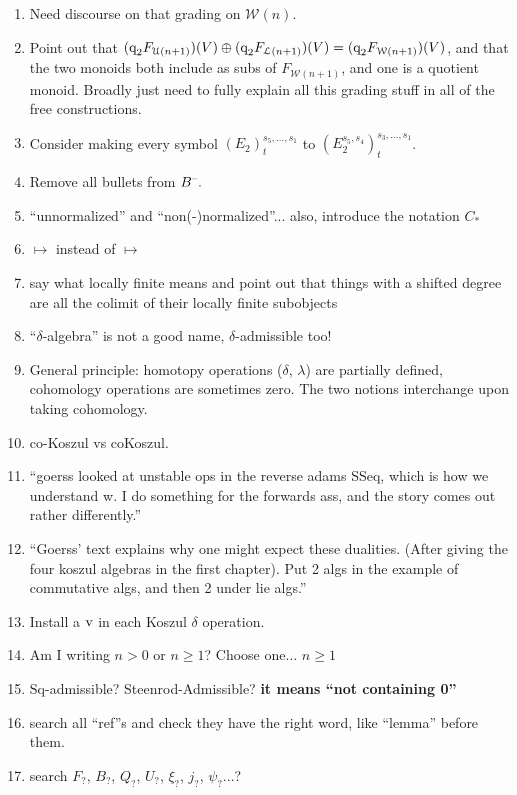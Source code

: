 \documentclass[11pt]{amsart}
\theoremstyle{plain}
\theoremstyle{definition}
\newcommand{\DASH}{\textup{--}}
\newcommand{\calU}{\mathcal{U}}
\newcommand{\calL}{\mathcal{L}}
\newcommand{\calw}{\mathcal{W}}
\newcommand{\calc}{\mathcal{C}}
\theoremstyle{plain}
\newcommand{\quadgrad}[1]{\textup{q}_{#1}}
\newcommand{\Sq}{\mathrm{Sq}}
\begin{document}
\begin{todolist}
\begin{enumerate}
\item Need discourse on that grading on $\calw(n)$.
\item Point out that $(\quadgrad{2}F_{\calU(n+1)})(V)\oplus (\quadgrad{2}F_{\calL(n+1)})(V)=(\quadgrad{2}F_{\calw(n+1)})(V)$, and that the two monoids both include as subs of $F_{\calw(n+1)}$, and one is a quotient monoid. Broadly just need to fully explain all this grading stuff in all of the free constructions.
\item Consider making every symbol $(E_2)^{s_5,\ldots,s_1}_t$ to $(E_2^{s_5,s_4})^{s_3,\ldots,s_1}_t$.
\item Remove all bullets from $B^{\DASH}.$
\item ``unnormalized'' and ``non(-)normalized''... also, introduce the notation $C_*$
\item $\longmapsto$ instead of $\mapsto$
\item say what locally finite means and point out that things with a shifted degree are all the colimit of their locally finite subobjects
\item ``$\delta$-algebra'' is not a good name, $\delta$-admissible too!
\item General principle: homotopy operations ($\delta$, $\lambda$) are partially defined, cohomology operations are sometimes zero. The two notions interchange upon taking cohomology.
\item co-Koszul vs coKoszul.
\item ``goerss looked at unstable ops in the reverse adams SSeq, which is how we understand w. I do something for the forwards ass, and the story comes out rather differently.''
\item 
``Goerss' text explains why one might expect these dualities. (After giving the four koszul algebras in the first chapter). Put 2 algs in the example of commutative algs, and then 2 under lie algs.''
\item Install a $\textup{v}$ in each Koszul $\delta$ operation.
\item Am I writing $n>0$ or $n\geq1$? Choose one... $n\geq1$
\item $\Sq$-admissible? Steenrod-Admissible? \textbf{it means ``not containing 0''}
\item search all ``ref''s and check they have the right word, like ``lemma'' before them.
\item search $F_?$, $B_?$, $Q_?$, $U_?$, $\xi_?$, $j_?$, $\psi_?$...?

\end{enumerate}
\end{todolist}
\end{document}
